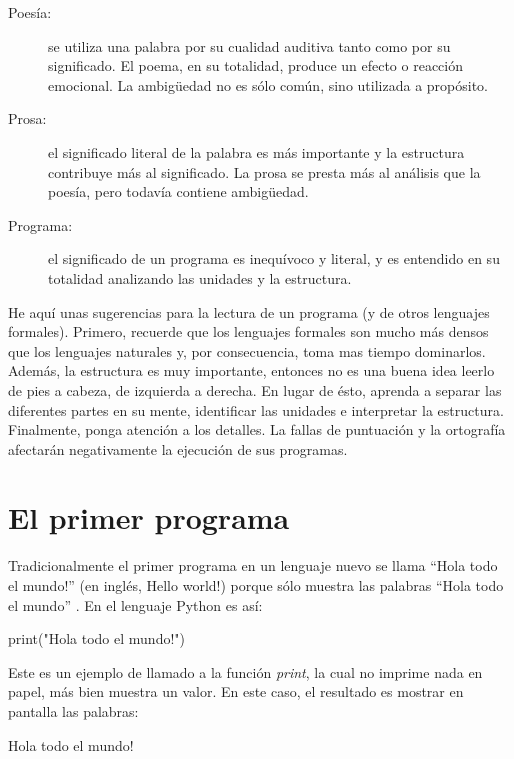  
\begin{description}
\item [{Poesía:}] se utiliza una palabra por su cualidad auditiva tanto
como por su significado. El poema, en su totalidad, produce un efecto
o reacción emocional. La ambigüedad no es sólo común, sino utilizada
a propósito.
\item [{Prosa:}] el significado literal de la palabra es más importante
y la estructura contribuye más al significado. La prosa se presta
más al análisis que la poesía, pero todavía contiene ambigüedad.
\item [{Programa:}] el significado de un programa es inequívoco y literal,
y es entendido en su totalidad analizando las unidades y la estructura.
\end{description}
He aquí unas sugerencias para la lectura de un programa (y de otros
lenguajes formales). Primero, recuerde que los lenguajes formales
son mucho más densos que los lenguajes naturales y, por consecuencia,
toma mas tiempo dominarlos. Además, la estructura es muy importante,
entonces no es una buena idea leerlo de pies a cabeza, de izquierda
a derecha. En lugar de ésto, aprenda a separar las diferentes partes
en su mente, identificar las unidades e interpretar la estructura.
Finalmente, ponga atención a los detalles. La fallas de puntuación
y la ortografía afectarán negativamente la ejecución de sus programas.

\section{El primer programa}

\label{hello} \label{hello world}

Tradicionalmente el primer programa en un lenguaje nuevo se llama
``Hola todo el mundo!'' (en inglés, Hello world!) porque sólo muestra
las palabras ``Hola todo el mundo'' . En el lenguaje Python es así:

\begin{pyconcode}
print("Hola todo el mundo!")
\end{pyconcode}

Este es un ejemplo de llamado a la función {\em print}, la cual
no imprime nada en papel, más bien muestra un valor. En este caso,
el resultado es mostrar en pantalla las palabras:

\begin{pyconcode}
Hola todo el mundo!
\end{pyconcode}

